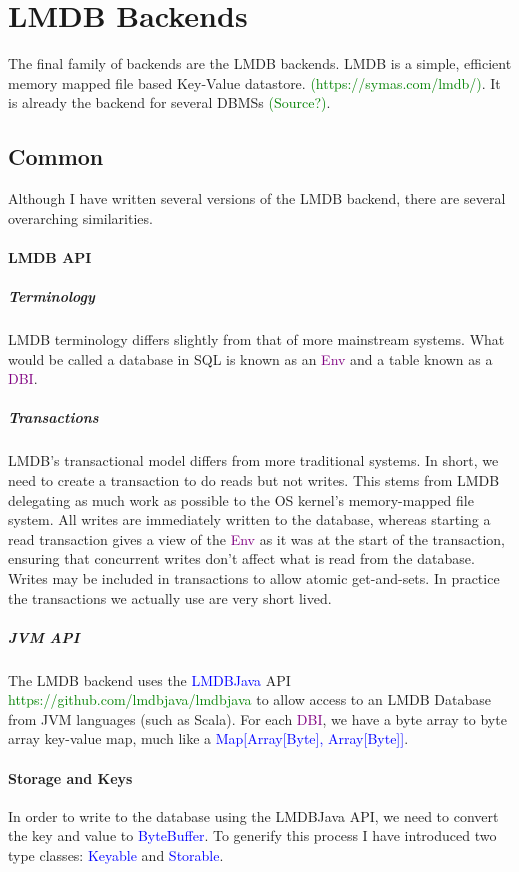 \documentclass[12pt,a4paper,twoside,openright]{report}
\newcommand\codeName[1]{\textcolor{blue}{#1}}
\newcommand\term[1]{\textcolor{purple}{#1}}
\newcommand\toReference[1]{\textcolor{green}{#1}}
\begin{document}
{{\section{LMDB Backends}
The final family of backends are the LMDB backends. LMDB is a simple, efficient memory mapped file based Key-Value datastore. \toReference{(https://symas.com/lmdb/)}. It is already the backend for several DBMSs \toReference{(Source?)}.

	\subsection{Common}
	Although I have written several versions of the LMDB backend, there are several overarching similarities.
		\paragraph{LMDB API}
			\subparagraph{Terminology}
			LMDB terminology differs slightly from that of more mainstream systems. What would be called a database in SQL is known as an \term{Env} and a table known as a \term{DBI}.
			\subparagraph{Transactions}
				LMDB's transactional model differs from more traditional systems. In short, we need to create a transaction to do reads but not writes. This stems from LMDB delegating as much work as possible to the OS kernel's memory-mapped file system. All writes are immediately written to the database, whereas starting a read transaction gives a view of the \term{Env} as it was at the start of  the transaction, ensuring that concurrent writes don't affect what is read from the database. Writes may be included in transactions to allow atomic get-and-sets. In practice the transactions we actually use are very short lived.
			\subparagraph{JVM API}
			The LMDB backend uses the \codeName{LMDBJava} API \toReference{https://github.com/lmdbjava/lmdbjava} to allow access to an LMDB Database from JVM languages (such as Scala). For each \term{DBI}, we have a byte array to byte array key-value map, much like a \codeName{Map[Array[Byte], Array[Byte]]}.
			
		\paragraph{Storage and Keys}
			In order to write to the database using the LMDBJava API, we need to convert the key and value to \codeName{ByteBuffer}. To generify this process I have introduced two type classes: \codeName{Keyable} and \codeName{Storable}.
			
}}
\end{document}
